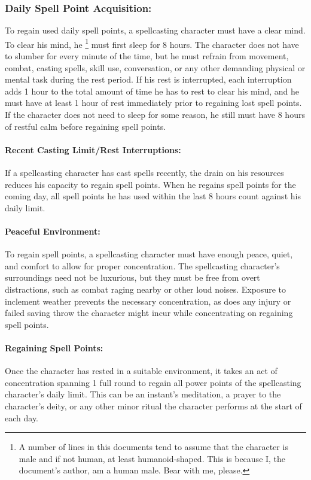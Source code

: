 \subsubsection{Daily Spell Point Acquisition:}
\label{sec:DailySpellPointAcquisition}
To regain used daily spell points, a spellcasting character must have a clear mind. 
To clear his mind, he \footnote{A number of lines in this documents tend to assume that the character is male and if not human, at least humanoid-shaped.
This is because I, the document's author, am a human male. Bear with me, please.}
must first sleep for 8 hours.
The character does not have to slumber for every minute of the time, 
but he must refrain from movement, combat, casting spells, skill use, conversation, or any other demanding physical or mental task during the rest period. 
If his rest is interrupted, each interruption adds 1 hour to the total amount of time he has to rest to clear his mind, 
and he must have at least 1 hour of rest immediately prior to regaining lost spell points. 
If the character does not need to sleep for some reason, he still must have 8 hours of restful calm before regaining spell points.

\paragraph{Recent Casting Limit/Rest Interruptions:} If a spellcasting character has cast spells recently, 
the drain on his resources reduces his capacity to regain spell points. 
When he regains spell points for the coming day, all spell points he has used within the last 8 hours count against his daily limit.

\paragraph{Peaceful Environment:} To regain spell points, a spellcasting character must have enough peace, quiet, and comfort to allow for proper concentration. 
The spellcasting character's surroundings need not be luxurious, 
but they must be free from overt distractions, such as combat raging nearby or other loud noises. 
Exposure to inclement weather prevents the necessary concentration, 
as does any injury or failed saving throw the character might incur while concentrating on regaining spell points.

\paragraph{Regaining Spell Points:} Once the character has rested in a suitable environment, 
it takes an act of concentration spanning 1 full round to regain all power points of the spellcasting character's daily limit. 
This can be an instant's meditation, a prayer to the character's deity, or any other minor ritual the character performs at the start of each day.

